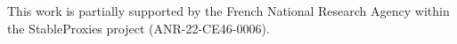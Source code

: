 \documentclass[runningheads]{llncs}
\begin{document}
    \begin{credits}
        \subsubsection{\ackname}
        This work is partially supported by the French National Research Agency
        within the StableProxies project (ANR-22-CE46-0006).
    \end{credits}
%
%
%
    
    
\end{document}
